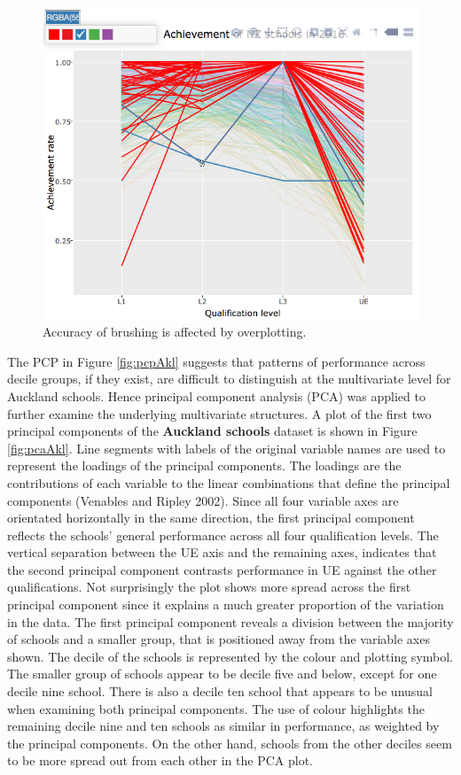 \documentclass[]{book}
\theoremstyle{definition}
\theoremstyle{definition}
\theoremstyle{definition}
\theoremstyle{remark}
\begin{document}
\begin{figure}[center]
\includegraphics[width=700px]{files/pcp_busy} \caption{Accuracy of brushing is affected by overplotting.}\label{fig:pcpBusy}
\end{figure}

The PCP in Figure \ref{fig:pcpAkl} suggests that patterns of performance
across decile groups, if they exist, are difficult to distinguish at the
multivariate level for Auckland schools. Hence principal component
analysis (PCA) was applied to further examine the underlying
multivariate structures. A plot of the first two principal components of
the \textbf{Auckland schools} dataset is shown in Figure
\ref{fig:pcaAkl}. Line segments with labels of the original variable
names are used to represent the loadings of the principal components.
The loadings are the contributions of each variable to the linear
combinations that define the principal components (Venables and Ripley
2002). Since all four variable axes are orientated horizontally in the
same direction, the first principal component reflects the schools'
general performance across all four qualification levels. The vertical
separation between the UE axis and the remaining axes, indicates that
the second principal component contrasts performance in UE against the
other qualifications. Not surprisingly the plot shows more spread across
the first principal component since it explains a much greater
proportion of the variation in the data. The first principal component
reveals a division between the majority of schools and a smaller group,
that is positioned away from the variable axes shown. The decile of the
schools is represented by the colour and plotting symbol. The smaller
group of schools appear to be decile five and below, except for one
decile nine school. There is also a decile ten school that appears to be
unusual when examining both principal components. The use of colour
highlights the remaining decile nine and ten schools as similar in
performance, as weighted by the principal components. On the other hand,
schools from the other deciles seem to be more spread out from each
other in the PCA plot.
\end{document}
